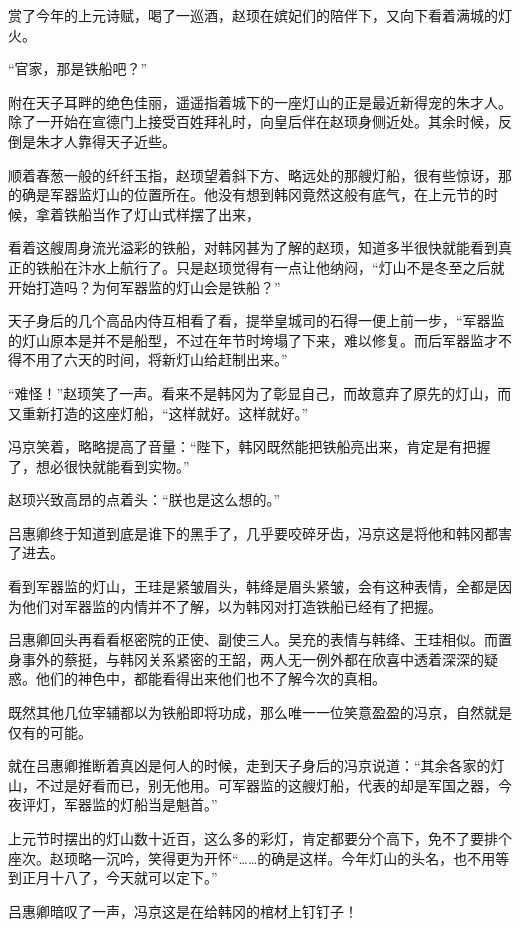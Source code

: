 赏了今年的上元诗赋，喝了一巡酒，赵顼在嫔妃们的陪伴下，又向下看着满城的灯火。

“官家，那是铁船吧？”

附在天子耳畔的绝色佳丽，遥遥指着城下的一座灯山的正是最近新得宠的朱才人。除了一开始在宣德门上接受百姓拜礼时，向皇后伴在赵顼身侧近处。其余时候，反倒是朱才人靠得天子近些。

顺着春葱一般的纤纤玉指，赵顼望着斜下方、略远处的那艘灯船，很有些惊讶，那的确是军器监灯山的位置所在。他没有想到韩冈竟然这般有底气，在上元节的时候，拿着铁船当作了灯山式样摆了出来，

看着这艘周身流光溢彩的铁船，对韩冈甚为了解的赵顼，知道多半很快就能看到真正的铁船在汴水上航行了。只是赵顼觉得有一点让他纳闷，“灯山不是冬至之后就开始打造吗？为何军器监的灯山会是铁船？”

天子身后的几个高品内侍互相看了看，提举皇城司的石得一便上前一步，“军器监的灯山原本是并不是船型，不过在年节时垮塌了下来，难以修复。而后军器监才不得不用了六天的时间，将新灯山给赶制出来。”

“难怪！”赵顼笑了一声。看来不是韩冈为了彰显自己，而故意弃了原先的灯山，而又重新打造的这座灯船，“这样就好。这样就好。”

冯京笑着，略略提高了音量：“陛下，韩冈既然能把铁船亮出来，肯定是有把握了，想必很快就能看到实物。”

赵顼兴致高昂的点着头：“朕也是这么想的。”

吕惠卿终于知道到底是谁下的黑手了，几乎要咬碎牙齿，冯京这是将他和韩冈都害了进去。

看到军器监的灯山，王珪是紧皱眉头，韩绛是眉头紧皱，会有这种表情，全都是因为他们对军器监的内情并不了解，以为韩冈对打造铁船已经有了把握。

吕惠卿回头再看看枢密院的正使、副使三人。吴充的表情与韩绛、王珪相似。而置身事外的蔡挺，与韩冈关系紧密的王韶，两人无一例外都在欣喜中透着深深的疑惑。他们的神色中，都能看得出来他们也不了解今次的真相。

既然其他几位宰辅都以为铁船即将功成，那么唯一一位笑意盈盈的冯京，自然就是仅有的可能。

就在吕惠卿推断着真凶是何人的时候，走到天子身后的冯京说道：“其余各家的灯山，不过是好看而已，别无他用。可军器监的这艘灯船，代表的却是军国之器，今夜评灯，军器监的灯船当是魁首。”

上元节时摆出的灯山数十近百，这么多的彩灯，肯定都要分个高下，免不了要排个座次。赵顼略一沉吟，笑得更为开怀“……的确是这样。今年灯山的头名，也不用等到正月十八了，今天就可以定下。”

吕惠卿暗叹了一声，冯京这是在给韩冈的棺材上钉钉子！

